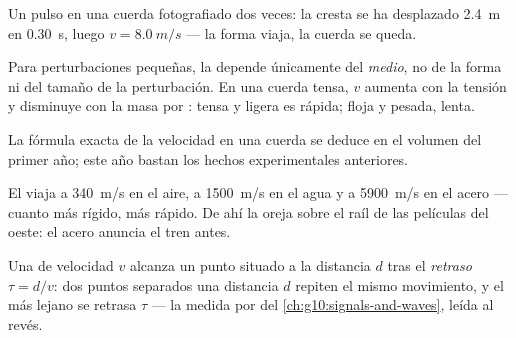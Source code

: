 \begin{omfigure}

{\small Un pulso en una cuerda fotografiado dos veces: la cresta se ha
desplazado \qty{2.4}{m} en \qty{0.30}{s}, luego $v = \qty{8.0}{m/s}$ ---
la forma viaja, la cuerda se queda.}
\end{omfigure}

\begin{proposition}\label{prop:g12:mechanical-waves:medium}
Para perturbaciones pequeñas, la  depende
únicamente del \emph{medio}, no de la forma ni del tamaño de la
perturbación. En una cuerda tensa, $v$ aumenta con la tensión y
disminuye con la masa por : tensa y ligera es rápida; floja y
pesada, lenta. \admitted
\end{proposition}

\begin{remark}\label{rem:g12:mechanical-waves:ropeformula}
La fórmula exacta de la velocidad en una cuerda se deduce en el volumen
del primer año; este año bastan los hechos experimentales anteriores.
\end{remark}

\begin{example}\label{ex:g12:mechanical-waves:speeds}
El  viaja a \qty{340}{m/s} en el aire, a \qty{1500}{m/s} en el
agua y a \qty{5900}{m/s} en el acero --- cuanto más rígido, más rápido.
De ahí la oreja sobre el raíl de las películas del oeste: el acero
anuncia el tren antes.
\end{example}

\begin{definition}[Retraso]\label{def:g12:mechanical-waves:delay}
Una  de velocidad $v$ alcanza un punto situado a la distancia $d$
tras el \emph{retraso} $\tau = d/v$: dos puntos separados
una distancia $d$ repiten el mismo movimiento, y el más lejano se
retrasa $\tau$ --- la medida por  del
\cref{ch:g10:signals-and-waves}, leída al revés.
\end{definition}

